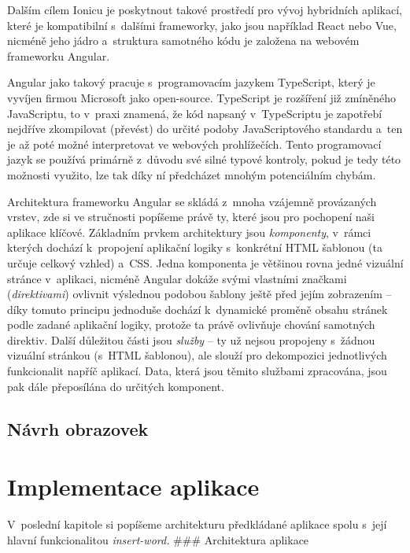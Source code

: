 Dalším cílem Ionicu je poskytnout takové prostředí pro vývoj hybridních
aplikací, které je kompatibilní s~dalšími frameworky, jako jsou
například React nebo Vue, nicméně jeho jádro a~struktura samotného kódu
je založena na webovém frameworku Angular.~\parencite{ionic}

Angular jako takový pracuje s~programovacím jazykem TypeScript, který je
vyvíjen firmou Microsoft jako open-source. TypeScript je rozšíření již
zmíněného JavaScriptu, to v~praxi znamená, že kód napsaný v~TypeScriptu
je zapotřebí nejdříve zkompilovat (převést) do určité podoby
JavaScriptového standardu a~ten je až poté možné interpretovat ve
webových prohlížečích. Tento programovací jazyk se používá primárně
z~důvodu své silné typové kontroly, pokud je tedy této možnosti využito,
lze tak díky ní předcházet mnohým potenciálním chybám.
\parencite{typescript}

Architektura frameworku Angular se skládá z~mnoha vzájemně provázaných
vrstev, zde si ve stručnosti popíšeme právě ty, které jsou pro pochopení
naši aplikace klíčové. Základním prvkem architektury jsou
\emph{komponenty}, v~rámci kterých dochází k~propojení aplikační logiky
s~konkrétní HTML šablonou (ta určuje celkový vzhled) a~CSS. Jedna
komponenta je většinou rovna jedné vizuální stránce v~aplikaci, nicméně
Angular dokáže svými vlastními značkami (\emph{direktivami}) ovlivnit
výslednou podobou šablony ještě před jejím zobrazením -- díky tomuto
principu jednoduše dochází k~dynamické proměně obsahu stránek podle
zadané aplikační logiky, protože ta právě ovlivňuje chování samotných
direktiv. Další důležitou části jsou \emph{služby} -- ty už nejsou
propojeny s~žádnou vizuální stránkou (s~HTML šablonou), ale slouží pro
dekompozici jednotlivých funkcionalit napříč aplikací. Data, která jsou
těmito službami zpracována, jsou pak dále přeposílána do určitých
komponent.~\parencite{angulararchitecture}

\hypertarget{nuxe1vrh-obrazovek}{%
\subsection{Návrh obrazovek}\label{nuxe1vrh-obrazovek}}

\hypertarget{implementace-aplikace}{%
\section{Implementace aplikace}\label{implementace-aplikace}}

V~poslední kapitole si popíšeme architekturu předkládané aplikace spolu
s~její hlavní funkcionalitou \emph{insert-word.} \#\#\# Architektura
aplikace

